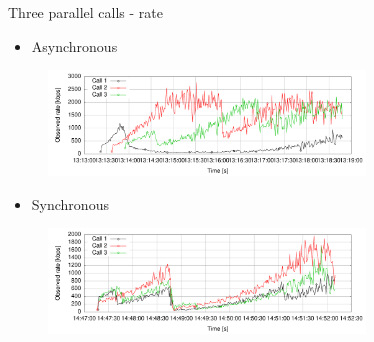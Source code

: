 \documentclass[first=red,second=purple,logo=yellowexc]{aaltoslides}
\begin{document}
\begin{frame}{Three parallel calls - rate}

\begin{itemize}
\item Asynchronous
\end{itemize}
\begin{figure}[h]
  \centering
  \includegraphics[width=0.75\textwidth]{async_three-calls.pdf}
\end{figure}
\begin{itemize}
\item Synchronous
\end{itemize}
\begin{figure}[h]
  \centering
  \includegraphics[width=0.75\textwidth]{sync3_three-calls20130504_195405.pdf}
\end{figure}
\end{frame}

\end{document}

